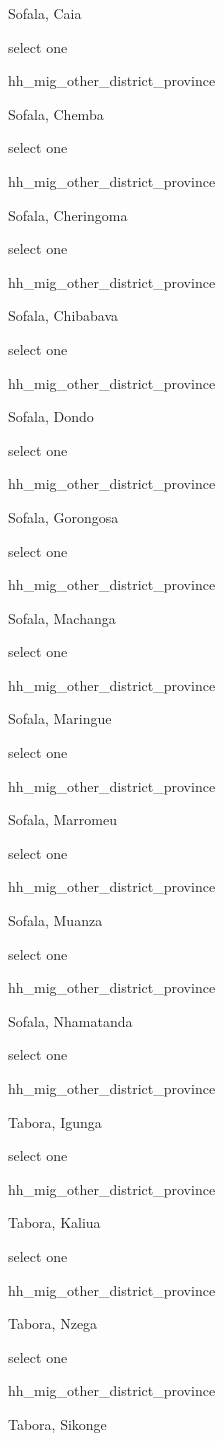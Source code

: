 \documentclass[]{article}
\begin{document}
Sofala, Caia

select one

hh\_mig\_other\_district\_province

Sofala, Chemba

select one

hh\_mig\_other\_district\_province

Sofala, Cheringoma

select one

hh\_mig\_other\_district\_province

Sofala, Chibabava

select one

hh\_mig\_other\_district\_province

Sofala, Dondo

select one

hh\_mig\_other\_district\_province

Sofala, Gorongosa

select one

hh\_mig\_other\_district\_province

Sofala, Machanga

select one

hh\_mig\_other\_district\_province

Sofala, Maringue

select one

hh\_mig\_other\_district\_province

Sofala, Marromeu

select one

hh\_mig\_other\_district\_province

Sofala, Muanza

select one

hh\_mig\_other\_district\_province

Sofala, Nhamatanda

select one

hh\_mig\_other\_district\_province

Tabora, Igunga

select one

hh\_mig\_other\_district\_province

Tabora, Kaliua

select one

hh\_mig\_other\_district\_province

Tabora, Nzega

select one

hh\_mig\_other\_district\_province

Tabora, Sikonge
\end{document}

